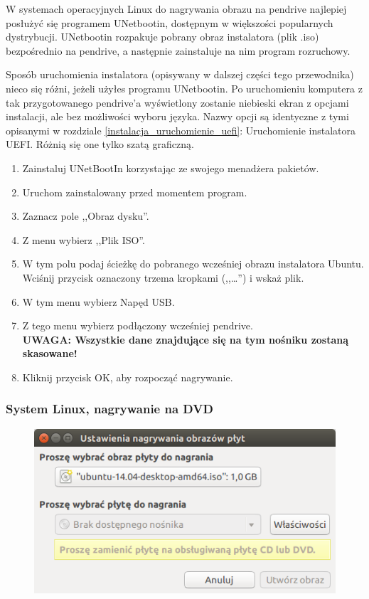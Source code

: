 W systemach operacyjnych Linux do nagrywania obrazu na pendrive najlepiej posłużyć się programem \textcolor{ubuntu_orange}{UNetbootin}, dostępnym w większości popularnych dystrybucji. UNetbootin rozpakuje pobrany obraz instalatora (plik .iso) bezpośrednio na pendrive, a następnie zainstaluje na nim program rozruchowy.

Sposób uruchomienia instalatora (opisywany w dalszej części tego przewodnika) nieco się różni, jeżeli użyłes programu UNetbootin. Po uruchomieniu komputera z tak przygotowanego pendrive'a wyświetlony zostanie niebieski ekran z opcjami instalacji, ale bez możliwości wyboru języka. Nazwy opcji są identyczne z tymi opisanymi w rozdziale \ref{instalacja_uruchomienie_uefi}: Uruchomienie instalatora UEFI. Różnią się one tylko szatą graficzną.
\begin{enumerate}[label=\protect\circled{\arabic*}]
\item Zainstaluj UNetBootIn korzystając ze swojego menadżera pakietów.
\item Uruchom zainstalowany przed momentem program.
\item Zaznacz pole ,,Obraz dysku''.
\item Z menu wybierz ,,Plik ISO''.
\item W tym polu podaj ścieżkę do pobranego wcześniej obrazu instalatora Ubuntu. Wciśnij przycisk oznaczony trzema kropkami (,,\ldots'') i wskaż plik.
\item W tym menu wybierz Napęd USB.
\item Z tego menu wybierz podłączony wcześniej pendrive.\\
\textbf{UWAGA: Wszystkie dane znajdujące się na tym nośniku zostaną skasowane!}
\item Kliknij przycisk \textcolor{ubuntu_orange}{OK}, aby rozpocząć nagrywanie.
\end{enumerate}

\subsubsection{System Linux, nagrywanie na DVD}
\begin{figure}
	\vspace{-10pt}
	\includegraphics[width=\linewidth]{images/instalacja_nagrywanie_obrazu_linux_DVD.png}
\end{figure}

